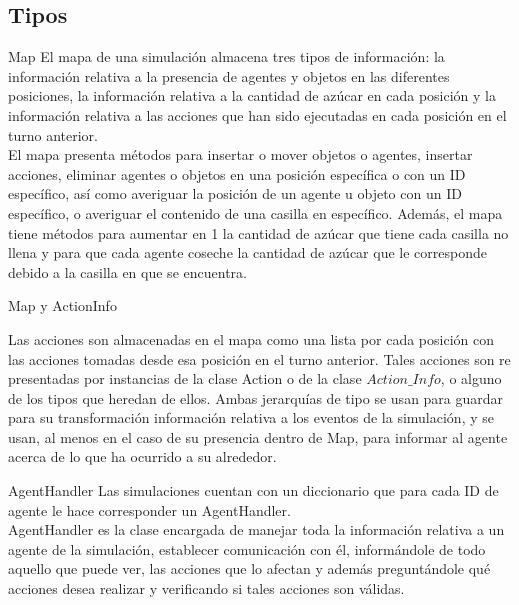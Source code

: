 \documentclass{beamer}
\begin{document}
\subsection{Tipos}
\begin{frame}{Map}
  El mapa de una simulación almacena tres tipos de información: la información relativa a la presencia de agentes y objetos en las diferentes posiciones, la información relativa a la cantidad de azúcar en cada posición y la información relativa a las acciones que han sido ejecutadas en cada posición en el turno anterior.\\
  El mapa presenta métodos para insertar o mover objetos o agentes, insertar acciones, eliminar agentes o objetos en una posición específica o con un ID específico, así como averiguar la posición de un agente u objeto con un ID específico, o averiguar el contenido de una casilla en específico. Además, el mapa tiene métodos para aumentar en 1 la cantidad de azúcar que tiene cada casilla no llena y para que cada agente coseche la cantidad de azúcar que le corresponde debido a la casilla en que se encuentra.\\
\end{frame}

\begin{frame}{Map y ActionInfo}

  Las acciones son almacenadas en el mapa como una lista por cada posición con las acciones tomadas desde esa posición en el turno anterior. Tales acciones son re
  presentadas por instancias de la clase Action o de la clase $Action\_Info$, o alguno de los tipos que heredan de ellos. Ambas jerarquías de tipo se usan para guardar para su transformación información relativa a los eventos de la simulación, y se usan, al menos en el caso de su presencia dentro de Map, para informar al agente acerca de lo que ha ocurrido a su alrededor.
\end{frame}

\begin{frame}{Agent\textunderscore Handler}
  Las simulaciones cuentan con un diccionario que para cada ID de agente le hace corresponder un Agent\textunderscore Handler.\\
  Agent\textunderscore Handler es la clase encargada de manejar toda la información relativa a un agente de la simulación, establecer comunicación con él, informándole de todo aquello que puede ver, las acciones que lo afectan y además preguntándole qué acciones desea realizar y verificando si tales acciones son válidas.
\end{frame}
\end{document}
